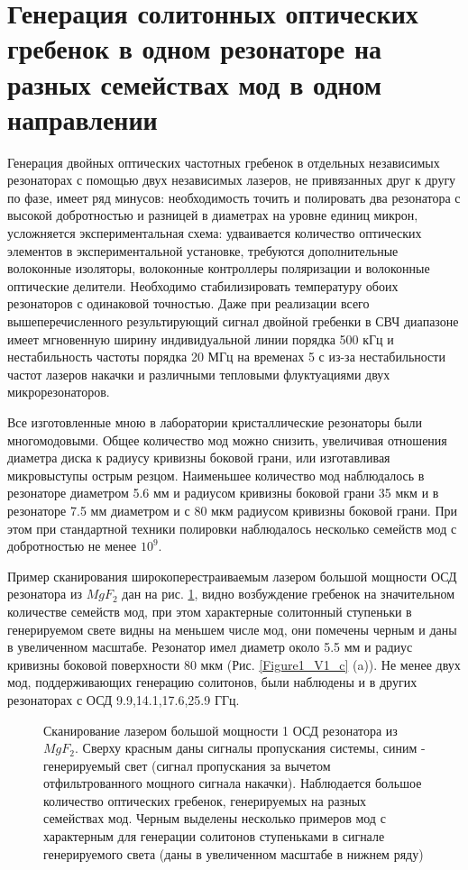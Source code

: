 \section{Генерация солитонных оптических гребенок в одном резонаторе на разных семействах мод в одном направлении}

Генерация двойных оптических частотных гребенок в отдельных независимых резонаторах с помощью двух независимых лазеров, не привязанных друг к другу по фазе, имеет ряд минусов: необходимость точить и полировать два резонатора с высокой добротностью и разницей в диаметрах на уровне единиц микрон, усложняется экспериментальная схема: удваивается количество оптических элементов в экспериментальной установке, требуются дополнительные волоконные изоляторы, волоконные контроллеры поляризации и волоконные оптические делители. Необходимо стабилизировать температуру обоих резонаторов с одинаковой точностью. Даже при реализации всего вышеперечисленного результирующий сигнал двойной гребенки в СВЧ диапазоне имеет мгновенную ширину индивидуальной линии порядка 500 кГц и нестабильность частоты порядка 20 МГц на временах 5 с из-за нестабильности частот лазеров накачки и различными тепловыми флуктуациями двух микрорезонаторов.

Все изготовленные мною в лаборатории кристаллические резонаторы были многомодовыми. Общее количество мод можно снизить, увеличивая отношения диаметра диска к радиусу кривизны боковой грани, или изготавливая микровыступы острым резцом. Наименьшее количество мод наблюдалось в резонаторе диаметром 5.6 мм и радиусом кривизны боковой грани 35 мкм и в резонаторе 7.5 мм диаметром и с 80 мкм радиусом кривизны боковой грани. При этом при стандартной техники полировки наблюдалось несколько семейств мод с добротностью не менее $10^9$.

Пример сканирования широкоперестраиваемым лазером большой мощности ОСД резонатора из $MgF_2$ дан на рис. \ref{Scan_SolitonSpot}, видно возбуждение гребенок на значительном количестве семейств мод, при этом характерные солитонный ступеньки в генерируемом свете видны на меньшем числе мод, они помечены черным и даны в увеличенном масштабе. Резонатор имел диаметр около 5.5 мм и радиус кривизны боковой поверхности 80 мкм (Рис. \ref{Figure1_V1_c} (a)). Не менее двух мод, поддерживающих генерацию солитонов, были наблюдены и в других резонаторах с ОСД 9.9,14.1,17.6,25.9 ГГц.

\begin{figure}[ht]
\begin{minipage}[ht]{1\linewidth}
\end{minipage}
\caption{Сканирование лазером большой мощности 1 ОСД резонатора из $MgF_2$. Сверху красным даны сигналы пропускания системы, синим - генерируемый свет (сигнал пропускания за вычетом отфильтрованного мощного сигнала накачки). Наблюдается большое количество оптических гребенок, генерируемых на разных семействах мод. Черным выделены несколько примеров мод с характерным для генерации солитонов ступеньками в сигнале генерируемого света (даны в увеличенном масштабе в нижнем ряду)}
\label{Scan_SolitonSpot}
\end{figure}

